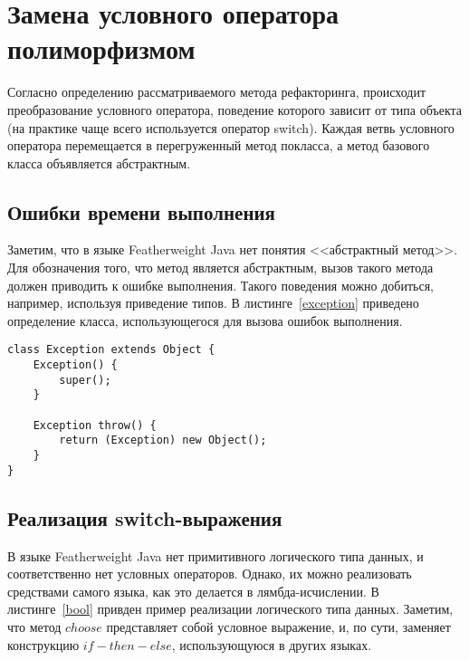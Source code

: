 \section{Замена условного оператора полиморфизмом}
Согласно определению рассматриваемого метода рефакторинга, происходит преобразование условного оператора, поведение которого зависит от типа объекта (на практике чаще всего используется оператор switch).
Каждая ветвь условного оператора перемещается в перегруженный метод покласса, а метод базового класса объявляется абстрактным.

\subsection{Ошибки времени выполнения}
Заметим, что в языке Featherweight Java нет понятия <<абстрактный метод>>. Для обозначения того, что метод является абстрактным, вызов такого метода должен приводить к ошибке выполнения.
Такого поведения можно добиться, например, используя приведение типов. В листинге~\ref{exception} приведено определение класса, использующегося для вызова ошибок выполнения.
\begin{lstlisting}[float=htb,label=exception,caption=Определение класса Exception]
class Exception extends Object {
    Exception() {
        super();
    }

    Exception throw() {
        return (Exception) new Object();
    }
}
\end{lstlisting}

\subsection{Реализация switch-выражения}
В языке Featherweight Java нет примитивного логического типа данных, и соответственно нет условных операторов. Однако, их можно реализовать средствами самого языка, как это делается в лямбда-исчислении.
В листинге~\ref{bool} привден пример реализации логического типа данных. Заметим, что метод $choose$ представляет собой условное выражение, и, по сути, заменяет конструкцию $if-then-else$,
использующуюся в других языках.

